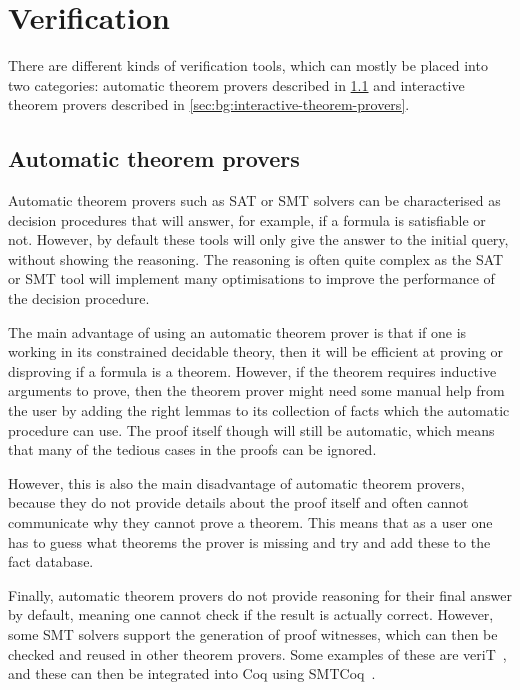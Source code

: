 \section{Verification}%
\label{sec:bg:verification}

There are different kinds of verification tools, which can mostly be placed into
two categories: automatic theorem provers described in
\cref{sec:bg:automatic-theorem-provers} and interactive theorem provers
described in \cref{sec:bg:interactive-theorem-provers}.

\subsection{Automatic theorem provers}%
\label{sec:bg:automatic-theorem-provers}

Automatic theorem provers such as \gls{SAT} or \gls{SMT} solvers can be
characterised as decision procedures that will answer, for example, if a formula
is satisfiable or not.  However, by default these tools will only give the
answer to the initial query, without showing the reasoning.  The reasoning is
often quite complex as the \gls{SAT} or \gls{SMT} tool will implement many
optimisations to improve the performance of the decision procedure.

The main advantage of using an automatic theorem prover is that if one is
working in its constrained decidable theory, then it will be efficient at
proving or disproving if a formula is a theorem.  However, if the theorem
requires inductive arguments to prove, then the theorem prover might need some
manual help from the user by adding the right lemmas to its collection of facts
which the automatic procedure can use.  The proof itself though will still be
automatic, which means that many of the tedious cases in the proofs can be
ignored.

However, this is also the main disadvantage of automatic theorem provers,
because they do not provide details about the proof itself and often cannot
communicate why they cannot prove a theorem.  This means that as a user one has
to guess what theorems the prover is missing and try and add these to the fact
database.

Finally, automatic theorem provers do not provide reasoning for their final
answer by default, meaning one cannot check if the result is actually correct.
However, some SMT solvers support the generation of proof witnesses, which can
then be checked and reused in other theorem provers.  Some examples of these are
veriT~\cite{bouton09}, and these can then be integrated into Coq using
SMTCoq~\cite{armand11_modul_integ_sat_smt_solver}.

